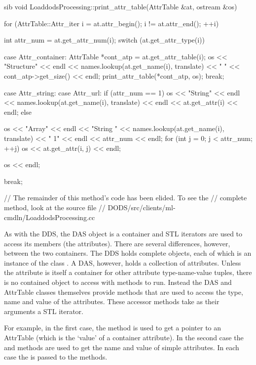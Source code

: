 \documentclass{dods-paper}
\begin{document}
\begin{vcode}{sib}
void
LoaddodsProcessing::print_attr_table(AttrTable &at, ostream &os)
{
    for (AttrTable::Attr_iter i = at.attr_begin(); i != at.attr_end(); ++i) {
        int attr_num = at.get_attr_num(i);
        switch (at.get_attr_type(i)) {
          case Attr_container: {
              AttrTable *cont_atp = at.get_attr_table(i);
              os << "Structure" << endl << names.lookup(at.get_name(i), translate)
                 << " " << cont_atp->get_size() << endl;
              print_attr_table(*cont_atp, os);
              break;
          }

          case Attr_string:
          case Attr_url:
            if (attr_num == 1) {
                os << "String" << endl << names.lookup(at.get_name(i), translate) << endl
                   << at.get_attr(i) << endl;
            }
            else {
                os << "Array" << endl << "String " << names.lookup(at.get_name(i), translate)
                   << " 1" << endl << attr_num << endl;
                for (int j = 0; j < attr_num; ++j)
                    os << at.get_attr(i, j) << endl;

                os << endl;
            }
            break;

          // The remainder of this method's code has been elided. To see the 
          // complete method, look at the source file 
          // DODS/src/clients/ml-cmdln/LoaddodsProcessing.cc
        }
    }
}
\end{vcode}

As with the DDS, the DAS object is a container and STL iterators are used to
access its members (the attributes). There are several differences, however,
between the two containers. The DDS holds complete objects, each of which is
an instance of the class . A DAS, however, holds a collection
of attributes. Unless the attribute is itself a container for other attribute
type-name-value tuples, there is no contained object to access with methods
to run. Instead the DAS and AttrTable classes themselves provide methods that
are used to access the type, name and value of the attributes. These accessor
methods take as their arguments a STL iterator. 

For example, in the first case, the method 
is used to get a pointer to an AttrTable (which is the `value' of a container
attribute). In the second case the  and
 methods are used to get the name and value of
simple attributes. In each case the   is passed to the
methods. 
\end{document}
